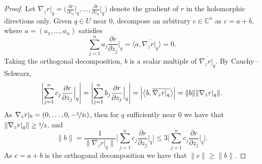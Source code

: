 \documentclass[12pt,openany]{book}
\newcommand{\blinnprod}[2]{\bigl\langle #1 , #2 \bigr\rangle}
\newcommand{\snorm}[1]{\lVert {#1} \rVert}
\newcommand{\Babs}[1]{\Bigl\lvert {#1} \Bigr\rvert}
\newcommand{\BBabs}[1]{\Biggl\lvert {#1} \Biggr\rvert}
\newcommand{\abs}[1]{\left\lvert {#1} \right\rvert}
\newcommand{\C}{{\mathbb{C}}}
\theoremstyle{plain}
\theoremstyle{remark}
\theoremstyle{definition}
\theoremstyle{exercise}
\theoremstyle{example}
\begin{document}
\begin{proof}
Let $\nabla_z r|_q =
\bigl(
\frac{\partial r}{\partial z_1}\big|_q,\ldots,
\frac{\partial r}{\partial z_n}\big|_q \bigr)$ denote the gradient of $r$ in
the holomorphic directions only.
Given $q \in U$ near $0$,
decompose an arbitrary $c \in \C^n$ as $c = a+b$, where $a = (a_1,\ldots,a_n)$
satisfies
\begin{equation*}
\sum_{j=1}^n
a_j \frac{\partial r}{\partial z_j} \Big|_q = 
\blinnprod{a}{\overline{\nabla_z r|_q}}
=
0 .
\end{equation*}
Taking the orthogonal decomposition, $b$ is a scalar multiple of
$\overline{\nabla_z r|_q}$.
By Cauchy--Schwarz,
\begin{equation*}
\BBabs{\sum_{j=1}^n c_j \frac{\partial r}{\partial z_j} \Big|_q}
=
\BBabs{\sum_{j=1}^n b_j \frac{\partial r}{\partial z_j} \Big|_q}
=
\Babs{\blinnprod{b}{\overline{\nabla_z r|_q}}}
=
\snorm{b} \snorm {\nabla_z r|_q} .
\end{equation*}
As $\nabla_z r|_0 = (0,\ldots,0,-\nicefrac{1}{2i})$, then for $q$ sufficiently near $0$ we have that
$\snorm{\nabla_z r|_q} \geq \nicefrac{1}{3}$, and
\begin{equation*}
\snorm{b} =
\frac{1}{\snorm
{\nabla_z r|_q}}
\BBabs{\sum_{j=1}^n c_j \frac{\partial r}{\partial z_j} \Big|_q}
\leq
3 \BBabs{\sum_{j=1}^n c_j \frac{\partial r}{\partial z_j} \Big|_q}
.
\end{equation*}
As $c = a+b$ is the orthogonal decomposition we have that $\snorm{c} \geq
\snorm{b}$.


\end{proof}
\end{document}
